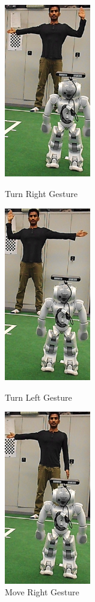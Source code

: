 \begin{figure}	 	
	\begin{minipage}
		{.3 
			\textwidth}  
		\centering
		\includegraphics[height=75mm]{figures/result/res-ges-turn-right.png} \caption{Turn Right Gesture} \label{res:ges:turn:right} 
	\end{minipage}
	\begin{minipage}
		{.3 
			\textwidth}  
		\centering
		\includegraphics[height=75mm]{figures/result/res-ges-turn-left.png} \caption{Turn Left Gesture} \label{res:ges:turn:left} 
	\end{minipage}
	\begin{minipage}
		{.3
			\textwidth}  
		\centering
		\includegraphics[height=75mm]{figures/result/res-ges-move-right.png} \caption{Move Right Gesture} \label{res:ges:move:right} 

\end{minipage}
\end{figure}
